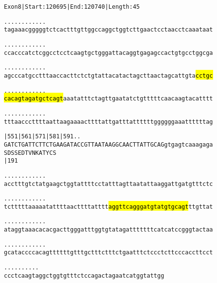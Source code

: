 \documentclass{article}
\begin{document}
\begin{alltt}
Exon 8 | Start: 120695 | End: 120740 | Length: 45

.    .    .    .    .    .    .    .    .    .    .    .    
tagaaacgggggtctcactttgttggccaggctggtcttgaactcctaacctcaaataat

.    .    .    .    .    .    .    .    .    .    .    .    
ccacccatctcggcctcctcaagtgctgggattacaggtgagagccactgtgcctggcga

.    .    .    .    .    .    .    .    .    .    .    .    
agcccatgcctttaaccacttctctgtattacatactagcttaactagcattgta\hl{cctgc}

.    .    .    .    .    .    .    .    .    .    .    .    
\hl{cacagtagatgctcagt}aaatatttctagttgaatatctgtttttcaacaagtacatttt

.    .    .    .    .    .    .    .    .    .    .    .    
tttaacccttttaattaagaaaacttttattgatttattttttggggggaaattttttag

   |551      |561      |571      |581      |591   .    .    
GATCTGATTCTTCTGAAGATACCGTTAATAAGGCAACTTATTGCAGgtgagtcaaagaga
  S  D  S  S  E  D  T  V  N  K  A  T  Y  C  S               
                       |191                                 

.    .    .    .    .    .    .    .    .    .    .    .    
acctttgtctatgaagctggtattttcctatttagttaatattaaggattgatgtttctc

.    .    .    .    .    .    .    .    .    .    .    .    
tctttttaaaaatattttaacttttatttt\hl{aggttcagggatgtatgtgcagt}ttgttat

.    .    .    .    .    .    .    .    .    .    .    .    
ataggtaaacacacgacttgggatttggtgtatagatttttttcatcatccgggtactaa

.    .    .    .    .    .    .    .    .    .    .    .    
gcataccccacagttttttgtttgctttctttctgaatttctccctcttcccaccttcct

.    .    .    .    .    .    .    .    .    .
ccctcaagtaggctggtgtttctccagactagaatcatggtattgg
\end{alltt}
\newpage
\end{document}
